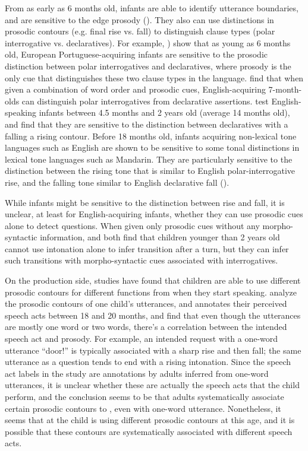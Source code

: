 From as early as 6 months old, infants are able to identify utterance boundaries, and are sensitive to the edge prosody (\cite{johnson2014edge}). They also can use distinctions in prosodic contours (e.g. final rise vs. fall) to distinguish clause types (polar interrogative vs. declaratives). For example, \textcite{frota2014}) show that as young as 6 months old, European Portuguese-acquiring infants are sensitive to the prosodic distinction between polar interrogatives and declaratives, where prosody is the only cue that distinguishes these two clause types in the language. \textcite{geffenmintz2011} find that when given a combination of word order and prosodic cues, English-acquiring 7-month-olds can distinguish polar interrogatives from declarative assertions. \textcite{soderstrom2005clause} test English-speaking infants between 4.5 months and 2 years old (average 14 months old), and find that they are sensitive to the distinction between declaratives with a falling a rising contour. Before 18 months old, infants acquiring non-lexical tone languages such as English are shown to be sensitive to some tonal distinctions in lexical tone languages such as Mandarin. They are particularly sensitive to the distinction between the rising tone that is similar to English polar-interrogative rise, and the falling tone similar to English declarative fall (\cite{shi2017tone, Hay2019}).%

While infants might be sensitive to the distinction between rise and fall, it is unclear, at least for English-acquiring infants, whether they can use prosodic cues alone to detect questions. When given only prosodic cues without any morpho-syntactic information, \textcite{keitel2013turn} and \textcite{casillas2017turn} both find that children younger than 2 years old cannot use intonation alone to infer transition after a turn, but they can infer such transitions with morpho-syntactic cues associated with interrogatives. 

On the production side, studies have found that children are able to use different prosodic contours for different functions from when they start speaking. \textcite{menyuk1969prosody} analyze the prosodic contours of one child's utterances, and annotates their perceived speech acts between 18  and 20 months, and find that even though the utterances are mostly one word or two words, there's a correlation between the intended speech act and prosody. For example, an intended request with a one-word utterance ``door!'' is typically associated with a sharp rise and then fall; the same utterance as a question tends to end with a rising intonation. Since the speech act labels in the study are annotations by adults inferred from one-word utterances, it is unclear whether these are actually the speech acts that the child perform, and the conclusion seems to be that adults systematically associate certain prosodic contours to \aqrs{}, even with one-word utterance. Nonetheless, it seems that at the child is using different prosodic contours at this age, and it is possible that these contours are systematically associated with different speech acts. 

